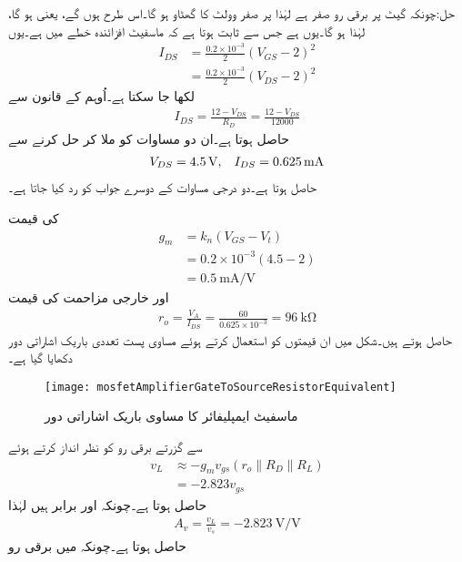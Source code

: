 حل:چونکہ گیٹ پر برقی رو صفر ہے لہٰذا  پر صفر وولٹ کا گھٹاو ہو گا۔اس طرح  ہوں گے، یعنی  ہو گا، لہٰذا  ہو گا۔یوں  ہے جس سے ثابت ہوتا ہے کہ ماسفیٹ افزائندہ خطے میں ہے۔یوں
\begin{align*}
I_{DS}&=\frac{0.2 \times 10^{-3}}{2} \left(V_{GS}-2 \right)^2\\
&=\frac{0.2 \times 10^{-3}}{2} \left(V_{DS}-2 \right)^2
\end{align*}
لکھا جا سکتا ہے۔اُوہم کے قانون سے
\begin{align*}
I_{DS}=\frac{12-V_{DS}}{R_D}=\frac{12-V_{DS}}{12000}
\end{align*}
حاصل ہوتا ہے۔ان دو مساوات کو ملا کر حل کرنے سے
\begin{align*}
V_{DS}=\SI{4.5}{\volt},\hspace{3mm} I_{DS}=\SI{0.625}{\milli \ampere}
\end{align*}
حاصل ہوتا ہے۔دو درجی مساوات کے دوسرے جواب کو رد کیا جاتا ہے۔

 کی قیمت
\begin{align*}
g_m&=k_n \left(V_{GS}-V_t \right)\\
&=0.2 \times 10^{-3} \left(4.5-2 \right)\\
&=\SI[per=frac,fraction=nice]{0.5}{\milli \ampere \per \volt}
\end{align*}
اور  خارجی مزاحمت  کی قیمت
\begin{align*}
r_o=\frac{V_A}{I_{DS}}=\frac{60}{0.625 \times 10^{-3}}=\SI{96}{\kilo \ohm}
\end{align*}
حاصل ہوتے ہیں۔شکل  میں ان قیمتوں کو استعمال کرتے ہوئے مساوی پست تعددی باریک اشاراتی  دور دکھایا گیا ہے۔
\begin{figure}
\centering
\texttt{[image: mosfetAmplifierGateToSourceResistorEquivalent]}
\caption{ماسفیٹ ایمپلیفائر کا مساوی باریک اشاراتی دور}
\label{شکل_ماسفیٹ_ایمپلیفائر_مساوی_باریک_اشاراتی_دور_مثال}
\end{figure}
 سے گزرتے برقی رو کو نظر انداز کرتے ہوئے
\begin{align*}
v_L& \approx -g_m v_{gs} \left(r_o \mathbin{\|} R_D \mathbin{\|} R_L \right)\\
&=-2.823 v_{gs}
\end{align*}
حاصل ہوتا ہے۔چونکہ  اور  برابر ہیں لہٰذا 
\begin{align*}
A_v=\frac{v_L}{v_s}=\SI[per=frac,fraction=nice]{-2.823}{\volt \per \volt}
\end{align*}
حاصل ہوتا ہے۔چونکہ  میں برقی رو

